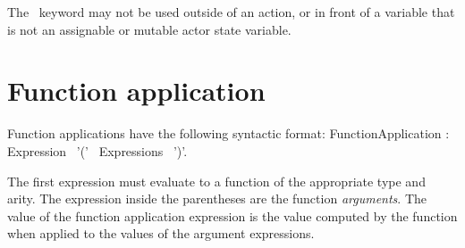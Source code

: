 The \kwOld~keyword may not be used outside of an action, or in front
of a variable that is not an assignable or mutable actor state variable.








\section{Function application}\label{sect:Application}

Function applications have the following syntactic format:
\bgr
  FunctionApplication : Expression ~'(' ~Expressions ~')'.
\egr

The first expression must evaluate to a function of the appropriate
type and arity. The expression inside the parentheses are the function
{\em arguments}. The value of the function application expression is
the value computed by the function when applied to the values of the
argument expressions.

